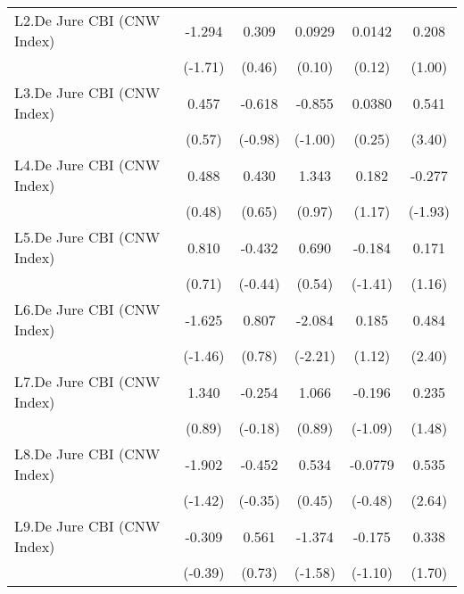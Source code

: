 {\begin{longtable}{l*{5}{c}}
\addlinespace
L2.De Jure CBI (CNW Index)&   -1.294         &    0.309         &   0.0929         &   0.0142         &    0.208         \\
                &  (-1.71)         &   (0.46)         &   (0.10)         &   (0.12)         &   (1.00)         \\
\addlinespace
L3.De Jure CBI (CNW Index)&    0.457         &   -0.618         &   -0.855         &   0.0380         &    0.541\sym{***}\\
                &   (0.57)         &  (-0.98)         &  (-1.00)         &   (0.25)         &   (3.40)         \\
\addlinespace
L4.De Jure CBI (CNW Index)&    0.488         &    0.430         &    1.343         &    0.182         &   -0.277         \\
                &   (0.48)         &   (0.65)         &   (0.97)         &   (1.17)         &  (-1.93)         \\
\addlinespace
L5.De Jure CBI (CNW Index)&    0.810         &   -0.432         &    0.690         &   -0.184         &    0.171         \\
                &   (0.71)         &  (-0.44)         &   (0.54)         &  (-1.41)         &   (1.16)         \\
\addlinespace
L6.De Jure CBI (CNW Index)&   -1.625         &    0.807         &   -2.084\sym{*}  &    0.185         &    0.484\sym{*}  \\
                &  (-1.46)         &   (0.78)         &  (-2.21)         &   (1.12)         &   (2.40)         \\
\addlinespace
L7.De Jure CBI (CNW Index)&    1.340         &   -0.254         &    1.066         &   -0.196         &    0.235         \\
                &   (0.89)         &  (-0.18)         &   (0.89)         &  (-1.09)         &   (1.48)         \\
\addlinespace
L8.De Jure CBI (CNW Index)&   -1.902         &   -0.452         &    0.534         &  -0.0779         &    0.535\sym{**} \\
                &  (-1.42)         &  (-0.35)         &   (0.45)         &  (-0.48)         &   (2.64)         \\
\addlinespace
L9.De Jure CBI (CNW Index)&   -0.309         &    0.561         &   -1.374         &   -0.175         &    0.338         \\
                &  (-0.39)         &   (0.73)         &  (-1.58)         &  (-1.10)         &   (1.70)         \\

\end{longtable}}
